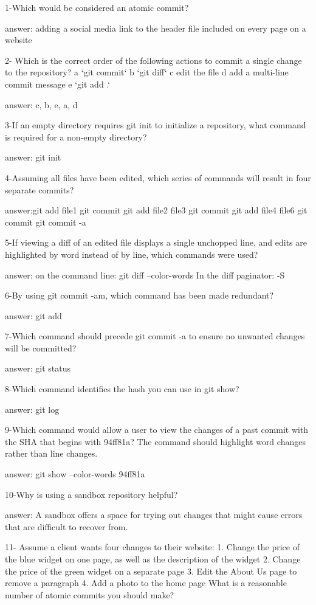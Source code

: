 1-Which would be considered an atomic commit?

answer: adding a social media link to the header file included on every page on a website

2-
Which is the correct order of the following actions to commit a single change to the repository? a `git commit`
b `git diff`
c edit the file
d add a multi-line commit message
e `git add .`

answer: c, b, e, a, d

3-If an empty directory requires git init to initialize a repository, what command is required for a non-empty directory?

answer: git init

4-Assuming all files have been edited, which series of commands will result in four separate commits?

answer:git add file1
git commit
git add file2 file3
git commit
git add file4 file6
git commit
git commit -a

5-If viewing a diff of an edited file displays a single unchopped line, and edits are highlighted by word instead of by line, which commands were used?

answer: on the command line: git diff --color-words In the diff paginator: -S

6-By using git commit -am, which command has been made redundant?

answer: git add

7-Which command should precede git commit -a to ensure no unwanted changes will be committed?

answer: git status

8-Which command identifies the hash you can use in git show?

answer: git log

9-Which command would allow a user to view the changes of a past commit with the SHA that begins with 94ff81a? The command should highlight word changes rather than line changes.

answer: git show --color-words 94ff81a

10-Why is using a sandbox repository helpful?

answer: A sandbox offers a space for trying out changes that might cause errors that are difficult to recover from.

11-
Assume a client wants four changes to their website: 1. Change the price of the blue widget on one page, as well as the description of the widget
2. Change the price of the green widget on a separate page
3. Edit the About Us page to remove a paragraph
4. Add a photo to the home page What is a reasonable number of atomic commits you should make?

